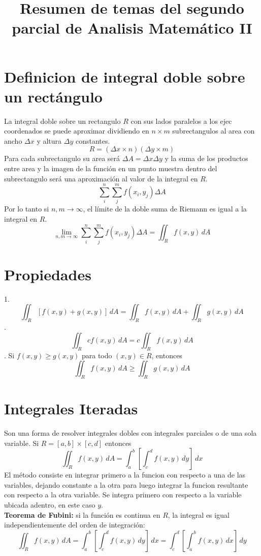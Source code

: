 \documentclass[12pt]{article}
\title{Resumen de temas del segundo parcial de Analisis Matemático II}
\begin{document}
\maketitle
\section{Definicion de integral doble sobre un rectángulo}
\par
La integral doble sobre un rectangulo $R$ con sus lados paralelos
a los ejec coordenados se puede aproximar dividiendo en $n\times m$ subrectangulos
al area con ancho $\Delta x$ y altura $\Delta y$ constantes. 
$$ R = (\Delta x \times n)( \Delta y \times m)$$
Para cada subrectangulo su area será $\Delta A = \Delta x \Delta y$ y la suma
de los productos entre area y la imagen de la función en un punto muestra
dentro del subrectangulo será una aproximación al valor de la integral en $R$.
$$\sum_i^n \sum_j^m f(x_i,y_j)\Delta A$$
Por lo tanto si $n, m \to \infty$, el límite de la doble suma de Riemann es igual
a la integral en $R$.
$$\lim_{n, m \to \infty}\sum_i^n \sum_j^m f(x_i,y_j)\Delta A = \iint_R f(x, y)\,dA$$

\section{Propiedades}
1. $$\iint_R [f(x,y) + g(x,y)]\,dA = \iint_R f(x,y)\,dA + \iint_R g(x,y) \,dA$$
. $$\iint_R cf(x,y)\,dA = c \iint_R f(x,y)\,dA$$
. Si $f(x,y) \geq g(x,y)$ para todo $ (x,y) \in R$, entonces
$$\iint_R f(x,y)\,dA \geq \iint_R g(x,y)\,dA$$

\section{Integrales Iteradas}
Son una forma de resolver integrales dobles con integrales parciales o de una
sola variable. Si $R = [a,b]\times[c,d]$ entonces 
$$\iint_R f(x,y)\,dA = \int_a^b[\int_c^d f(x,y)\,dy]\,dx$$
El método consiste en integrar primero a la funcion con respecto a una de las
variables, dejando constante a la otra para luego integrar la funcion resultante
con respecto a la otra variable. Se integra primero con respecto a la variable 
ubicada adentro, en este caso $y$.\\
\smallskip
\textbf{Teorema de Fubini:}  si la función es continua en $R$, 
la integral es igual independientemente del orden de integración:
$$\iint_R f(x,y)\,dA = \int_a^b[\int_c^d f(x,y)\,dy]\,dx = \int_c^d[\int_a^b f(x,y)\,dx]\,dy$$
\end{document}
